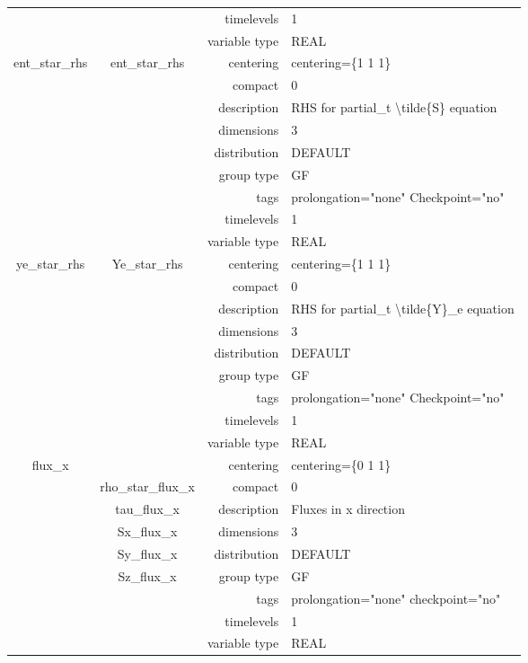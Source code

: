 \documentclass{article}
\begin{document}
\begin{tabular*}{150mm}{|c|c@{\extracolsep{\fill}}|rl|}
 &  & timelevels & 1 \\ 
 &  & variable type & REAL \\ 
\hline 
ent\_star\_rhs & ent\_star\_rhs & centering & centering=\{1 1 1\} \\ 
 &  & compact & 0 \\ 
 &  & description & RHS for partial\_t {\textbackslash}tilde\{S\} equation \\ 
 &  & dimensions & 3 \\ 
 &  & distribution & DEFAULT \\ 
 &  & group type & GF \\ 
 &  & tags & prolongation="none" Checkpoint="no" \\ 
 &  & timelevels & 1 \\ 
 &  & variable type & REAL \\ 
\hline 
ye\_star\_rhs & Ye\_star\_rhs & centering & centering=\{1 1 1\} \\ 
 &  & compact & 0 \\ 
 &  & description & RHS for partial\_t {\textbackslash}tilde\{Y\}\_e equation \\ 
 &  & dimensions & 3 \\ 
 &  & distribution & DEFAULT \\ 
 &  & group type & GF \\ 
 &  & tags & prolongation="none" Checkpoint="no" \\ 
 &  & timelevels & 1 \\ 
 &  & variable type & REAL \\ 
\hline 
flux\_x &  & centering & centering=\{0 1 1\} \\ 
 & rho\_star\_flux\_x & compact & 0 \\ 
 & tau\_flux\_x & description & Fluxes in x direction \\ 
 & Sx\_flux\_x & dimensions & 3 \\ 
 & Sy\_flux\_x & distribution & DEFAULT \\ 
 & Sz\_flux\_x & group type & GF \\ 
 &  & tags & prolongation="none" checkpoint="no" \\ 
 &  & timelevels & 1 \\ 
 &  & variable type & REAL \\ 
\hline 
\end{tabular*} 



\vspace{5mm}
\vspace{5mm}
\end{document}
